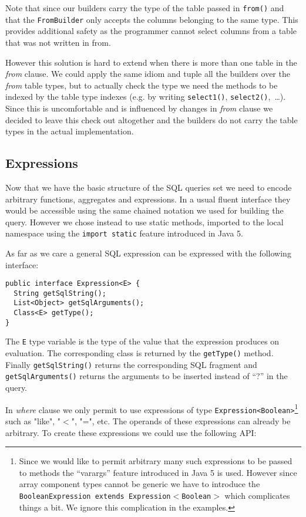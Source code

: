 \documentclass{sig-alternate}
\begin{document}
Note that since our builders carry the type of the table passed in \verb!from()! and that the \verb!FromBuilder! only accepts the columns belonging to the same type. This provides additional safety as the programmer cannot select columns from a table that was not written in from.

However this solution is hard to extend when there is more than one table in the \emph{from} clause. We could apply the same idiom and tuple all the builders over the \emph{from} table types, but to actually check the type we need the methods to be indexed by the table type indexes (e.g. by writing \verb!select1()!, \verb!select2()!,~\ldots). Since this is uncomfortable and is influenced by changes in \emph{from} clause we decided to leave this check out altogether and the builders do not carry the table types in the actual implementation.

\subsection{Expressions}

Now that we have the basic structure of the SQL queries set we need to encode arbitrary functions, aggregates and expressions. In a usual fluent interface they would be accessible using the same chained notation we used for building the query. However we chose instead to use static methods, imported to the local namespace using the \verb!import static! feature introduced in Java 5.

As far as we care a general SQL expression can be expressed with the following interface:

\begin{verbatim}
public interface Expression<E> {
  String getSqlString();
  List<Object> getSqlArguments();
  Class<E> getType();		
}
\end{verbatim}

The \verb!E! type variable is the type of the value that the expression produces on evaluation. The corresponding class is returned by the \verb!getType()! method. Finally \verb!getSqlString()! returns the corresponding SQL fragment and \verb!getSqlArguments()! returns the arguments to be inserted instead of ``?'' in the query. 

In \emph{where} clause we only permit to use expressions of type \verb!Expression<Boolean>!\footnote{Since we would like to permit arbitrary many such expressions to be passed to methods the ``varargs'' feature introduced in Java 5 is used. However since array component types cannot be generic we have to introduce the \texttt{BooleanExpression extends Expression$<$Boolean$>$} which complicates things a bit. We ignore this complication in the examples.} such as "like", "$<$", "=", etc. The operands of these expressions can already be arbitrary. To create these expressions we could use the following API:
\end{document}
